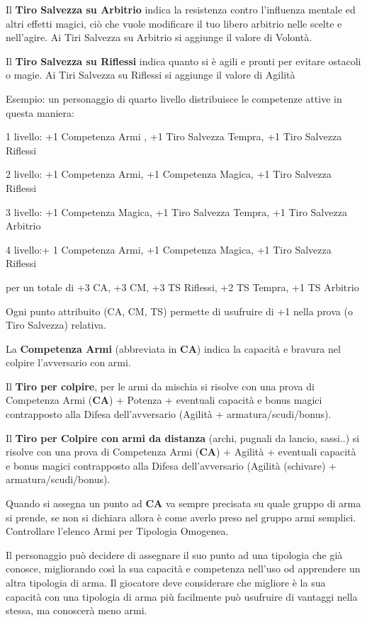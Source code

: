 \documentclass[a4paper,11pt,twoside,openany]{book}
\begin{document}
Il \textbf{Tiro Salvezza su Arbitrio} indica la resistenza contro l'influenza mentale ed altri effetti magici, ciò che vuole modificare il tuo libero arbitrio nelle scelte e nell'agire. Ai Tiri Salvezza su Arbitrio si aggiunge il valore di Volontà.

Il \textbf{Tiro Salvezza su Riflessi} indica quanto si è agili e pronti per evitare ostacoli o magie. Ai Tiri Salvezza su Riflessi si aggiunge il valore di Agilità

\bigskip

Esempio: un personaggio di quarto livello distribuisce le competenze
attive in questa maniera:

1 livello: +1 Competenza Armi , +1 Tiro Salvezza Tempra, +1 Tiro Salvezza Riflessi

2 livello: +1 Competenza Armi, +1 Competenza Magica, +1 Tiro Salvezza Riflessi

3 livello: +1 Competenza Magica, +1 Tiro Salvezza Tempra, +1 Tiro Salvezza Arbitrio

4 livello:+ 1 Competenza Armi, +1 Competenza Magica, +1 Tiro Salvezza Riflessi

per un totale di +3 CA, +3 CM, +3 TS Riflessi, +2 TS Tempra, +1 TS Arbitrio

\bigskip

Ogni punto attribuito (CA, CM, TS) permette di usufruire di +1 nella prova (o Tiro Salvezza) relativa.

La \textbf{Competenza Armi} (abbreviata in \textbf{CA}) indica la capacità e bravura nel colpire l'avversario con armi.

Il \textbf{Tiro per colpire}, per le armi da mischia si risolve con una prova di Competenza Armi (\textbf{CA}) + Potenza + eventuali capacità e bonus magici contrapposto alla Difesa dell'avversario (Agilità + armatura/scudi/bonus).

Il \textbf{Tiro per Colpire con armi da distanza} (archi, pugnali da lancio, sassi..) si risolve con una prova di Competenza Armi (\textbf{CA}) + Agilità + eventuali capacità e bonus magici contrapposto alla Difesa dell'avversario (Agilità (schivare) + armatura/scudi/bonus).

Quando si assegna un punto ad \textbf{CA} va sempre precisata su quale gruppo di arma si prende, se non si dichiara allora è come averlo preso nel gruppo armi semplici.
Controllare l'elenco Armi per Tipologia Omogenea.

Il personaggio può decidere di assegnare il suo punto ad una tipologia che già conosce, migliorando così la sua capacità e competenza nell'uso od apprendere un altra tipologia di arma.
Il giocatore deve considerare che migliore è la sua capacità con una tipologia di arma più facilmente può usufruire di vantaggi nella stessa, ma conoscerà meno armi.
\end{document}
